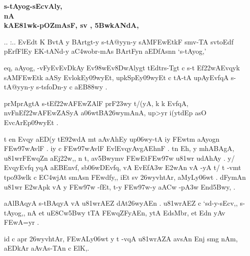 \vfill

{\dn
\begin{center}
{\Large\bfseries{s\2-tAyog{\rs -\re}sEcvAly,}}\\
{\Large\bfseries{nA {\dn\dnnum {}}}}\\
{\large\bfseries{kAE\381w\0k{\rs -\re}pOZ\0mAsF{\rs ,\re} s\2v {\dn\dnnum {}}{\rs ,\re} \35BwkANdA, {\dn\dnnum {}}}}
\end{center}
}

\newpage


{\dn .. :.. EvEdt\2 K BvtA\2 y BArtgt-y s\2-tA@yyn-y sAM\3FEwEtkF{\qva} smv-TA\2 sv\0toEdf\2 pErfFlEy\2 \dn\dnnum {} EK-tANd-y a\3C4wobr{\rs -\re}mAs\? BArtFy\?n aEDfAsn\?n {\rs `\re}s\2-tAyog,{\rs '\re}}

{\dn eq, aAyog, -vFyEvEvDkAy\?{\qvb} Ev\398wEv\38DwAlygt\2 tEdtr\-s\2-Tgt\2 c s\2-t\- Ef\322wAEvqyk\2 sAM\3FEwEtk aASy\2 EvlokEy\309wyEt{\rs ,\re} upkSpEy\309wyEt c tA\2-tA upAyEvf\?qA s\2-tA@yyn-y s\2-ts\2foDn-y c aEB\388wy\? .}

{\dn prMprAgtA\2 s\2-tEf\322wA\3FEwZAlF{\qva} prF\323wy t/(yA, k\? k\? Evf\?qA, nvFnEf\322wA\-\3FEwZASyA a\306wtBA\0\326wymAnA, up>y\?r i(y\?tdEp asO EvcArEp\309wyEt .}

{\dn t en\2 Evqy aED(y tE\392wdA\2 mt aAvAhEy up\306wy-tA iy\2 \3FEwt\?m aAyog\?n \3FEw\397wAvlF . iy\2 c \3FEw\397wAvlF EvlEvqyAvgAEhnF . t\?n Eh{\rs ,\re} y\? mhABAgA, u\381wr\3FEw\?qZ\?n aEj\322w\?,{\rs ,\re} n t\4, av\35Bwym\?v \3FEwEt\3FEw\397w u\381wr udAhAy\0 . y/ EvqyEvf\?q\? y\?qA aEBEnv\?f, s\2b\306wDEvf\?q, vA EvEf\3A3w\2 \3E2wAn\2 vA -yA t/ t\? -vmt\2 tpo\393wlk\2 c E\3C4wjAt\2 smAs\?n \3FEwdf\0y\?,{\rs ,\re} iEt sv\?{\qvb} \326wyvhtA\0r,  aMyLy\0\306wt\? . dFymAn u\381wr\2 \3E2wApk\2 vA y\2 \3FEw\397w\2 -fEt{\rs ,\re} t-y \3FEw\397w-y a\3ACw -p\3A3w\2 End\?{\qvb}\35Bwy, . }

{\dn aAlBAqyA s\2-tBAqyA vA u\381wrAEZ dAt\326wyAEn . u\381wrAEZ c {\rs `\re}sd-y{\rs -\re}sEcv,{\rs ,\re} s\2-tAyog,{\rs ,\re} nA \dn\dnnum {} et uE\38Cw\35Bwy tTA \3FEw\?qZFyAEn{\rs ,\re} ytA  EdsMbr{\rs ,\re}  et Edn\2 yAv \3FEwA=y\?r .}

{\dn  id\2 c apr\2 \326wyvhtA\0r, \3FEwALy\0\306wt\?{\rs ,\re} y t\? -v\?qA u\381wrAZA avsAn\? Enj\2 smg\5\2 nAm{\rs ,\re} aEDkAr aAvAs-TAn\2 c ElK\?,\1.}

